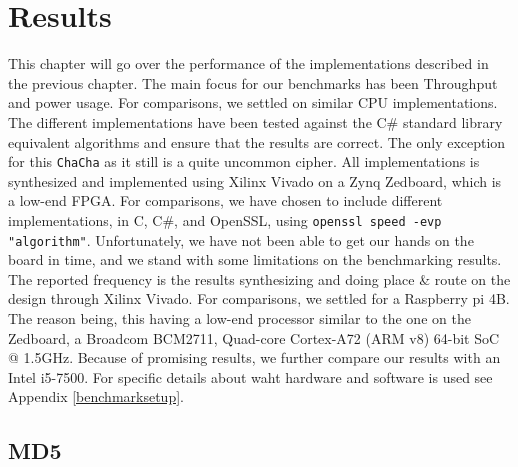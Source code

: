 \documentclass[a4paper, openany]{book}
\begin{document}
\chapter{Results}
\label{sec:org9511f90}
This chapter will go over the performance of the implementations described in the previous chapter.
The main focus for our benchmarks has been Throughput and power usage. For comparisons, we settled on similar CPU implementations.
The different implementations have been tested against the C\# standard library equivalent algorithms and ensure that the results are correct.
The only exception for this \texttt{ChaCha} as it still is a quite uncommon cipher.
All implementations is synthesized and implemented using Xilinx Vivado on a Zynq Zedboard, which is a low-end FPGA.
For comparisons, we have chosen to include different implementations, in C, C\#, and OpenSSL, using \texttt{openssl speed -evp "algorithm"}.
Unfortunately, we have not been able to get our hands on the board in time, and we stand with some limitations on the benchmarking results.
The reported frequency is the results synthesizing and doing place \& route on the design through Xilinx Vivado. For comparisons, we settled for a Raspberry pi 4B.
The reason being, this having a low-end processor similar to the one on the Zedboard, a Broadcom BCM2711, Quad-core Cortex-A72 (ARM v8) 64-bit SoC @ 1.5GHz.
Because of promising results, we further compare our results with an Intel i5-7500. For specific details about waht hardware and software is used see Appendix \ref{benchmarksetup}.

\section{MD5}
\label{sec:org0e226c6}
\label{sec:MD5performance}
\end{document}
